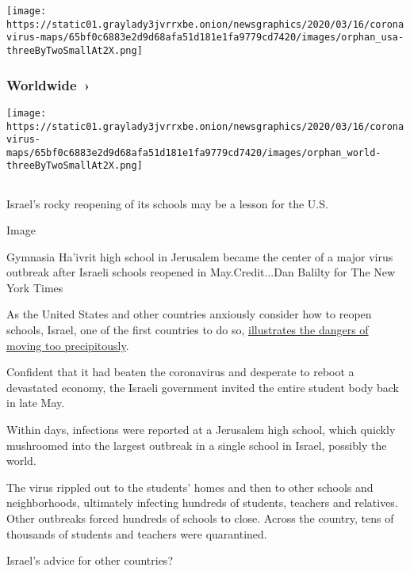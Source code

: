 \texttt{[image: https://static01.graylady3jvrrxbe.onion/newsgraphics/2020/03/16/coronavirus-maps/65bf0c6883e2d9d68afa51d181e1fa9779cd7420/images/orphan\_usa-threeByTwoSmallAt2X.png]}

\href{https://www.nytimes3xbfgragh.onion/interactive/2020/world/coronavirus-maps.html}{}

\hypertarget{worldwide-}{%
\subsubsection{Worldwide~›}\label{worldwide-}}

\texttt{[image: https://static01.graylady3jvrrxbe.onion/newsgraphics/2020/03/16/coronavirus-maps/65bf0c6883e2d9d68afa51d181e1fa9779cd7420/images/orphan\_world-threeByTwoSmallAt2X.png]}

\hypertarget{-1}{%
\subsection{}\label{-1}}

Israel's rocky reopening of its schools may be a lesson for the U.S.

Image

Gymnasia Ha'ivrit high school in Jerusalem became the center of a major
virus outbreak after Israeli schools reopened in May.Credit...Dan
Balilty for The New York Times

As the United States and other countries anxiously consider how to
reopen schools, Israel, one of the first countries to do so,
\href{https://www.nytimes3xbfgragh.onion/2020/08/04/world/middleeast/coronavirus-israel-schools-reopen.html}{illustrates
the dangers of moving too precipitously}.

Confident that it had beaten the coronavirus and desperate to reboot a
devastated economy, the Israeli government invited the entire student
body back in late May.

Within days, infections were reported at a Jerusalem high school, which
quickly mushroomed into the largest outbreak in a single school in
Israel, possibly the world.

The virus rippled out to the students' homes and then to other schools
and neighborhoods, ultimately infecting hundreds of students, teachers
and relatives. Other outbreaks forced hundreds of schools to close.
Across the country, tens of thousands of students and teachers were
quarantined.

Israel's advice for other countries?

